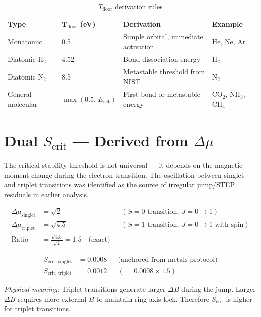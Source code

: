 \documentclass[12pt,a4paper]{article}
\theoremstyle{definition}
\begin{document}
\begin{table}[h!]
\centering
\caption{$T_{\mathrm{floor}}$ derivation rules}
\begin{tabular}{llll}
\toprule
\textbf{Type}       & $\boldsymbol{T_{\mathrm{floor}}}$ (eV) & \textbf{Derivation}                        & \textbf{Example}\\
\midrule
Monatomic           & 0.5                    & Simple orbital, immediate activation       & He, Ne, Ar\\
Diatomic H$_{2}$    & 4.52                   & Bond dissociation energy                   & H$_{2}$\\
Diatomic N$_{2}$    & 8.5                    & Metastable threshold from NIST             & N$_{2}$\\
General molecular   & $\max(0.5,\,E_{\mathrm{act}})$ & First bond or metastable energy    & CO$_{2}$, NH$_{3}$, CH$_{4}$\\
\bottomrule
\end{tabular}
\end{table}

\section{Dual $S_{\mathrm{crit}}$ --- Derived from $\Delta\mu$}

The critical stability threshold is not universal --- it depends on the magnetic moment change during the electron transition. The oscillation between singlet and triplet transitions was identified as the source of irregular jump/STEP residuals in earlier analysis.

\begin{align}
  \Delta\mu_{\mathrm{singlet}} &= \sqrt{2}     && (S=0 \text{ transition},\ J=0\to 1)\\
  \Delta\mu_{\mathrm{triplet}} &= \sqrt{4.5}   && (S=1 \text{ transition},\ J=0\to 1 \text{ with spin})\\
  \text{Ratio} &= \frac{\sqrt{4.5}}{\sqrt{2}} = 1.5 \quad \text{(exact)}
\end{align}

\begin{align}
  S_{\mathrm{crit,\,singlet}} &= 0.0008  && \text{(anchored from metals protocol)}\\
  S_{\mathrm{crit,\,triplet}} &= 0.0012  && (= 0.0008 \times 1.5)
\end{align}

\textit{Physical meaning:} Triplet transitions generate larger $\Delta B$ during the jump. Larger $\Delta B$ requires more external $B$ to maintain ring-axis lock. Therefore $S_{\mathrm{crit}}$ is higher for triplet transitions.
\end{document}
